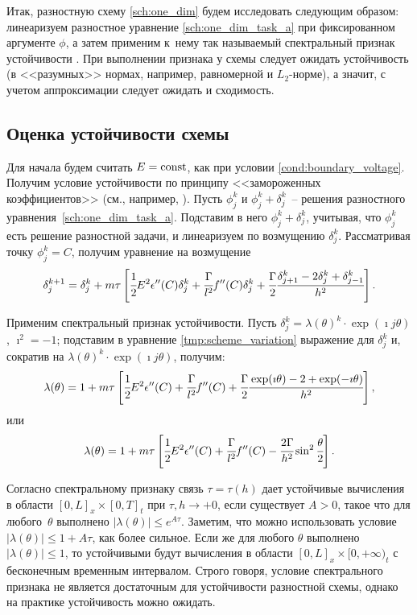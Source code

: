 Итак, разностную схему \eqref{sch:one_dim} будем исследовать следующим образом: линеаризуем разностное уравнение \eqref{sch:one_dim_task_a} при фиксированном аргументе $\phi$, а затем применим к~нему так называемый спектральный признак устойчивости \cite{bahvalov_computational_methods}. При выполнении признака у схемы следует ожидать устойчивость (в <<разумных>> нормах, например, равномерной и $L_2$-норме), а значит, с учетом аппроксимации следует ожидать и сходимость.


\subsection{Оценка устойчивости схемы}
\label{ssec:scheme_stability}

Для начала будем считать $E = \operatorname{{const}}$, как при условии \eqref{cond:boundary_voltage}. Получим условие устойчивости по принципу <<замороженных коэффициентов>> (см., например, \cite{bahvalov_computational_methods}). Пусть $\phi_j^k$ и $\phi_j^k + \delta_j^k$~-- решения разностного уравнения~\eqref{sch:one_dim_task_a}. Подставим в него $\phi_j^k + \delta_j^k$, учитывая, что $\phi_j^k$ есть решение разностной задачи, и линеаризуем по возмущению $\delta_j^k$. Рассматривая точку $\phi_j^k = C$, получим уравнение на возмущение
\begin{equation}
    \delta_j^{k + 1} = \delta_j^k + m \tau \left[ \cfrac{1}{2} E^2 \epsilon''(C) \delta_j^k + \cfrac{\Gamma}{l^2} f''(C) \delta_j^k + \cfrac{\Gamma}{2} \cfrac{\delta_{j + 1}^k - 2 \delta_j^k + \delta_{j - 1}^k}{h^2} \right].
    \label{tmp:scheme_variation}
\end{equation} 

Применим спектральный признак устойчивости. Пусть $\delta_j^k = \lambda(\theta)^k \cdot \exp(\imath j \theta)$, $\imath^2 = -1$; подставим в уравнение \eqref{tmp:scheme_variation} выражение для $\delta_j^k$ и, сократив на $\lambda(\theta)^k \cdot \exp(\imath j \theta)$, получим:
\[
    \lambda(\theta) = 1 + m \tau \left[ \cfrac{1}{2} E^2 \epsilon''(C) + \cfrac{\Gamma}{l^2} f''(C) + \cfrac{\Gamma}{2} \cfrac{\exp(\imath \theta) - 2 + \exp(-\imath \theta)}{h^2} \right],
\]
или
\begin{equation}
    \lambda(\theta) = 1 + m \tau \left[ \cfrac{1}{2} E^2 \epsilon''(C) + \cfrac{\Gamma}{l^2} f''(C) - \cfrac{2 \Gamma}{h^2} \sin^2 \cfrac{\theta}{2} \right].
    \label{tmp:spectral}
\end{equation}

Согласно спектральному признаку связь $\tau = \tau(h)$ дает устойчивые вычисления в области $[0, L]_x \times [0, T]_t$ при $\tau, h \to +0$, если существует $A > 0$, такое что для любого~$\theta$ выполнено $|\lambda(\theta)| \leqslant e^{A\tau}$. Заметим, что можно использовать условие $|\lambda(\theta)| \leqslant 1 + A\tau$, как более сильное. Если же для любого $\theta$ выполнено $|\lambda(\theta)| \leqslant 1$, то устойчивыми будут вычисления в области $[0, L]_x \times [0, +\infty)_t$ с бесконечным временным интервалом. Строго говоря, условие спектрального признака не является достаточным для устойчивости разностной схемы, однако на практике устойчивость можно ожидать.

